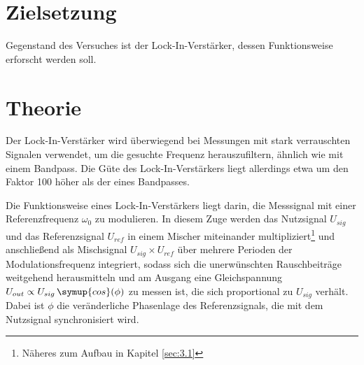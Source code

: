 \maketitle
\tableofcontents
\newpage

\section{Zielsetzung}
Gegenstand des Versuches ist der Lock-In-Verstärker, dessen Funktionsweise
erforscht werden soll.

\section{Theorie}
Der Lock-In-Verstärker wird überwiegend bei Messungen mit stark verrauschten Signalen
verwendet, um die gesuchte Frequenz herauszufiltern, ähnlich wie mit einem Bandpass.
Die Güte des Lock-In-Verstärkers liegt allerdings etwa um den Faktor 100 höher als
der eines Bandpasses.

Die Funktionsweise eines Lock-In-Verstärkers liegt darin,
die Messsignal mit einer Referenzfrequenz $\omega_0$ zu modulieren. In diesem Zuge
werden das Nutzsignal $U_ {sig}$ und das Referenzsignal $U_{ref}$ in einem Mischer
miteinander multipliziert\footnote{Näheres zum Aufbau in Kapitel \ref{sec:3.1}}
und anschließend als Mischsignal $U_{sig} \times U_{ref}$ über mehrere Perioden
der Modulationsfrequenz integriert, sodass sich die unerwünschten Rauschbeiträge
weitgehend herausmitteln und am Ausgang eine Gleichspannung $U_{out} \propto U_{sig} \,
\symup{cos}(\phi)$ zu messen ist, die sich proportional zu $U_{sig}$ verhält. Dabei
ist $\phi$ die veränderliche Phasenlage des Referenzsignals, die mit dem Nutzsignal synchronisiert
wird.

